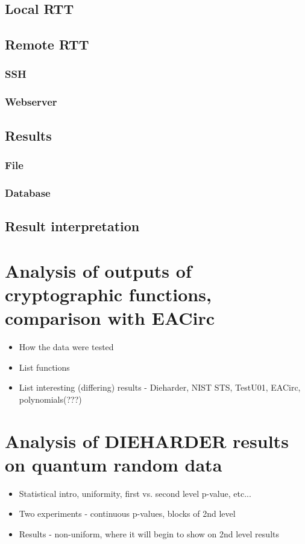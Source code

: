 \documentclass[
  digital,  	%
  color,		%
  oneside,   	%
  12pt,
  nocover,
  notable,
  nolof,
  nolot,
]{fithesis3}
\begin{document}
\section{Local RTT}

\section{Remote RTT}

\subsection{SSH}

\subsection{Webserver}

\section{Results}

\subsection{File}

\subsection{Database}

\section{Result interpretation}


 
\chapter{Analysis of outputs of cryptographic functions, comparison with EACirc}
\begin{itemize}
\item How the data were tested
\item List functions
\item List interesting (differing) results - Dieharder, NIST STS, TestU01, EACirc, polynomials(???)
\end{itemize}

\chapter{Analysis of DIEHARDER results on quantum random data}
\begin{itemize}
\item Statistical intro, uniformity, first vs. second level p-value, etc...
\item Two experiments - continuous p-values, blocks of 2nd level
\item Results - non-uniform, where it will begin to show on 2nd level results
\end{itemize}
\end{document}
